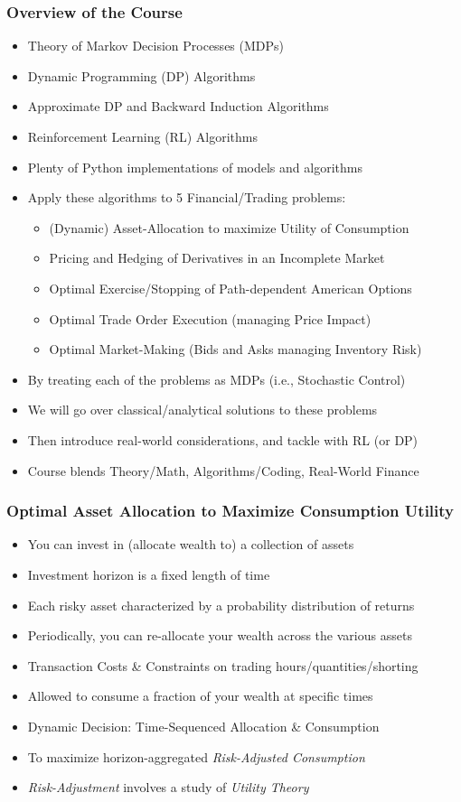 \documentclass[handout]{beamer}
\begin{document}
\begin{frame}
\frametitle{Overview of the Course}
\pause
\begin{itemize}[<+->]
\item Theory of Markov Decision Processes (MDPs)
\item Dynamic Programming (DP) Algorithms
\item Approximate DP and Backward Induction Algorithms
\item Reinforcement Learning (RL) Algorithms
\item Plenty of Python implementations of models and algorithms
\item Apply these algorithms to 5 Financial/Trading problems:
\begin{itemize}
\item (Dynamic) Asset-Allocation to maximize Utility of Consumption
\item Pricing and Hedging of Derivatives in an Incomplete Market
\item Optimal Exercise/Stopping of Path-dependent American Options
\item Optimal Trade Order Execution (managing Price Impact)
\item Optimal Market-Making (Bids and Asks managing Inventory Risk)
\end{itemize}
\item By treating each of the problems as MDPs (i.e., Stochastic Control)
\item We will go over classical/analytical solutions to these problems
\item Then introduce real-world considerations, and tackle with RL (or DP)
\item Course blends Theory/Math, Algorithms/Coding, Real-World Finance
\end{itemize}
\end{frame}

\begin{frame}
\frametitle{Optimal Asset Allocation to Maximize Consumption Utility}
\pause
\begin{itemize}[<+->]
\item You can invest in (allocate wealth to) a collection of assets
\item Investment horizon is a fixed length of time
\item Each risky asset characterized by a probability distribution of returns
\item Periodically, you can re-allocate your wealth across the various assets
\item Transaction Costs \& Constraints on trading hours/quantities/shorting
\item Allowed to consume a fraction of your wealth at specific times
\item Dynamic Decision: Time-Sequenced Allocation \& Consumption
\item To maximize horizon-aggregated {\em Risk-Adjusted Consumption}
\item {\em Risk-Adjustment} involves a study of {\em Utility Theory}
\end{itemize}
\end{frame}
\end{document}
